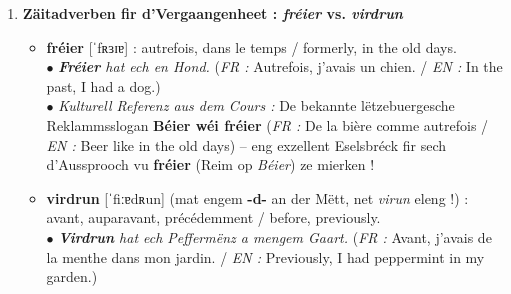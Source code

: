 \begin{enumerate}
    \item \textbf{Zäitadverben fir d'Vergaangenheet : \textit{fréier} vs. \textit{virdrun}}
    \begin{itemize}
        \item \textbf{fréier} [ˈfʀɜɪɐ] : autrefois, dans le temps / formerly, in the old days. \\
        $\bullet$ \textit{\textbf{Fréier} hat ech en Hond.} (\textit{FR :} Autrefois, j'avais un chien. / \textit{EN :} In the past, I had a dog.) \\
        $\bullet$ \textit{Kulturell Referenz aus dem Cours :} De bekannte lëtzebuergesche Reklammsslogan \textbf{\flqq Béier wéi fréier\frqq} (\textit{FR :} De la bière comme autrefois / \textit{EN :} Beer like in the old days) -- eng exzellent Eselsbréck fir sech d'Aussprooch vu \textbf{fréier} (Reim op \textit{Béier}) ze mierken !
        \item \textbf{virdrun} [ˈfiːɐdʀun] (mat engem \textbf{-d-} an der Mëtt, net \textit{\flqq *virun\frqq} eleng !) : avant, auparavant, précédemment / before, previously. \\
        $\bullet$ \textit{\textbf{Virdrun} hat ech Peffermënz a mengem Gaart.} (\textit{FR :} Avant, j'avais de la menthe dans mon jardin. / \textit{EN :} Previously, I had peppermint in my garden.)
    \end{itemize}

    \vspace{0.3em}


\end{enumerate}
